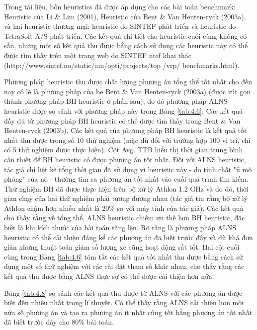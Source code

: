 Trong tài liệu, bốn heuristics đã được áp dụng cho các bài toán benchmark: Heuristic của Li \& Lim (2001), Heuristic của Bent \& Van Henten-ryck (2003a), và hai heuristic thương mại: heuristic do SINTEF phát triển và heuristic do TetraSoft A/S phát triển. Các kết quả chi tiết cho heuristic cuối cùng không có sẵn, nhưng một số kết quả thu được bằng cách sử dụng các heuristic này có thể được tìm thấy trên một trang web do SINTEF ntef khai thác (http://www.sintef.no/static/am/opti/projects/top /vrp/ benchmarks.html).

Phương pháp heuristic thu được chất lượng phương án tổng thể tốt nhất cho đến nay có lẽ là phương pháp của be Bent \& Van Henten-ryck (2003a) (được rút gọn thành phương pháp BH heuristic ở phần sau), do đó phương pháp ALNS heuristic được so sánh với phương pháp này trong Bảng \ref{tab:4.6}. Các kết quả đầy đủ từ phương pháp BH heuristic có thể được tìm thấy trong Bent \& Van Henten-ryck (2003b). Các kết quả của phương pháp BH heuristic là kết quả tốt nhất thu được trong số 10 thử nghiệm (mặc dù đối với trường hợp 100 vị trí, chỉ có 5 thử nghiệm được thực hiện). Cột Avg. TTB hiển thị thời gian trung bình cần thiết để BH heuristic có được phương án tốt nhất. Đối với ALNS heuristic, tác giả chỉ liệt kê tổng thời gian đã sử dụng vì heuristic này - do tính chất "ủ mô phỏng" của nó - thường tìm ra phương án tốt nhất vào cuối quá trình tìm kiếm. Thử nghiệm BH đã được thực hiện trên bộ xử lý Athlon 1.2 GHz và do đó, thời gian chạy của hai thử nghiệm phải tương đương nhau (tác giả tin rằng bộ xử lý Athlon chậm hơn nhiều nhất là 20\% so với máy tính của tác giả). Các kết quả cho thấy rằng về tổng thể, ALNS heuristic chiếm ưu thế hơn BH heuristic, đặc biệt là khi kích thước của bài toán tăng lên. Rõ ràng là phương pháp ALNS heuristic có thể cải thiện đáng kể các phương án đã biết trước đây và dù khá đơn giản nhưng thuật toán giảm số lượng xe cũng hoạt động rất tốt. Hai cột cuối cùng trong Bảng \ref{tab:4.6} tóm tắt các kết quả tốt nhất thu được bằng cách sử dụng một số thử nghiệm với các cài đặt tham số khác nhau, cho thấy rằng các kết quả thu được bằng ALNS thực sự có thể được cải thiện hơn nữa.

Bảng \ref{tab:4.8} so sánh các kết quả thu được từ ALNS với các phương án được biết đến nhiều nhất trong lí thuyết. Có thể thấy rằng ALNS cải thiện hơn một nửa số phương án và tạo ra phương án ít nhất cũng tốt bằng phương án tốt nhất đã biết trước đây cho 80\% bài toán.

